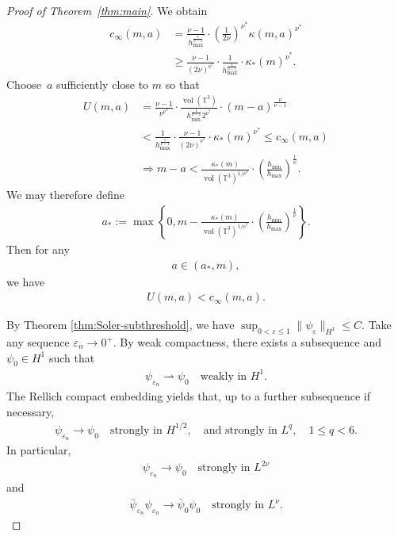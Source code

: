 \documentclass[11pt,final]{amsart}
\newcommand{\eps}{\varepsilon}
\begin{document}
\begin{proof}[Proof of Theorem~\ref{thm:main}]
We obtain
\begin{align}
c_\infty(m,a)
&=\frac{\nu-1}{h_{\max}^{\frac{1}{\nu-1}}}\cdot\left(\frac{1}{2\nu}\right)^{\nu^*}\kappa(m,a)^{\nu^*}\\
&\geq
\frac{\nu-1}{(2\nu)^{\nu^*}}\cdot\frac{1}{h_{\max}^{\frac{1}{\nu-1}}}\cdot\kappa_*(m)^{\nu^*}.
\end{align}
Choose~$a$ sufficiently close to $m$ so that
\begin{align}
U(m,a)&=\frac{\nu-1}{\nu^{\nu^*}}\cdot
\frac{\operatorname{vol}(\mathbb{T}^3)}{{h_{\min}^{\frac{1}{\nu-1}}}2^{\nu^*}}
\cdot(m-a)^{\frac{\nu}{\nu-1}}\\
&<\frac{1}{h_{\max}^{\frac{1}{\nu-1}}}\cdot\frac{\nu-1}{(2\nu)^{\nu^*}}\cdot\kappa_*(m)^{\nu^*}\leq c_\infty(m,a)\\
&\Rightarrow m-a< \frac{\kappa_*(m)}{\operatorname{vol}(\mathbb{T}^3)^{1/{\nu^*}}}\cdot\left(\frac{h_{\min}}{h_{\max}}\right)^{\frac{1}{\nu}}.
\end{align}
We may therefore define
\begin{align}
a_*
:=\max\left\{
0,
m-\frac{\kappa_*(m)}{\operatorname{vol}(\mathbb{T}^3)^{1/{\nu^*}}}\cdot\left(\frac{h_{\min}}{h_{\max}}\right)^{\frac{1}{\nu}}
\right\}.
\end{align}
Then for any
\begin{align}
a\in(a_*,m),
\end{align}
we have
\begin{align}
U(m,a)<c_\infty(m,a).
\end{align}

By Theorem \ref{thm:Soler-subthreshold}, we have $\sup_{0<\eps\le1}
\|\psi_\eps\|_{H^1}\le C$. Take any sequence $\eps_n\to0^+$. By weak compactness, there exists a subsequence and $\psi_0\in H^1$ such that
\begin{align}
\psi_{\eps_n}\rightharpoonup\psi_0
\quad\text{weakly in }H^1.
\end{align}
The Rellich compact embedding yields that, up to a further subsequence if necessary,
\begin{align}\label{strongly}
\psi_{\eps_n}\to\psi_0 
\quad\text{strongly in }H^{1/2}, 
\quad\text{and strongly in }L^q,
\quad 1\le q<6.
\end{align}
In particular,
\begin{align}
\psi_{\eps_n}\to\psi_0
\quad\text{strongly in }L^{2\nu}
\end{align}
and
\begin{align}
\bar\psi_{\eps_n}\psi_{\eps_n}
\to
\bar\psi_0\psi_0
\quad\text{strongly in }L^\nu.
\end{align}


\end{proof}
\end{document}
